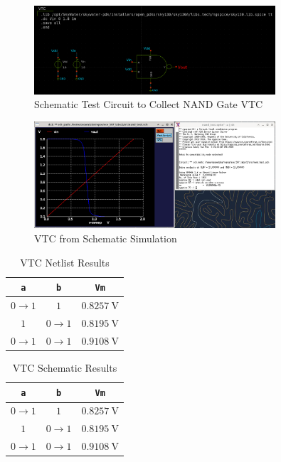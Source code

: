 \documentclass{article}
\begin{document}
	\begin{figure}[H]
		\centerline{\includegraphics[width=0.8\textwidth]{nand_vtc_test_circuit.png}}
		\caption{Schematic Test Circuit to Collect NAND Gate VTC}
		\label{fig::nand_vtc_schem_test_circuit}
	\end{figure}
	
	\begin{figure}[H]
		\centerline{\includegraphics[width=0.8\textwidth]{nand_vtc_schem.png}}
		\caption{VTC from Schematic Simulation}
		\label{fig::nand_vtc_schem}
	\end{figure}
	
	\begin{table}[H]
	\begin{center}
	\caption{VTC Netlist Results}
	\label{table::vtc_netlist}
	\begin{tabular}{| c | c | c |}
		\hline
		\texttt{a} & \texttt{b} & \texttt{Vm}\\
		\hline	
		$0 \rightarrow 1$ & $1$ & $0.8257\ \text{V}$\\
		\hline	
		$1$ & $0 \rightarrow 1$ & $0.8195\ \text{V}$\\
		\hline	
		$0 \rightarrow 1$ & $0 \rightarrow 1$ & $0.9108\ \text{V}$\\
		\hline
	\end{tabular}
	\end{center}
	\end{table}
	
	\begin{table}[H]
	\begin{center}
	\caption{VTC Schematic Results}
	\label{table::vtc_schematic}
	\begin{tabular}{| c | c | c |}
		\hline
		\texttt{a} & \texttt{b} & \texttt{Vm}\\
		\hline	
		$0 \rightarrow 1$ & $1$ & $0.8257\ \text{V}$\\
		\hline	
		$1$ & $0 \rightarrow 1$ & $0.8195\ \text{V}$\\
		\hline	
		$0 \rightarrow 1$ & $0 \rightarrow 1$ & $0.9108\ \text{V}$\\
		\hline
	\end{tabular}
	\end{center}
	\end{table}
	
\end{document}
